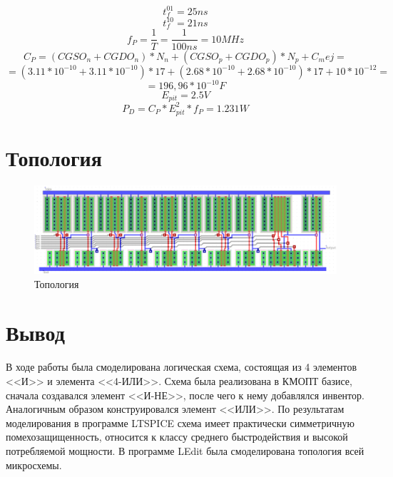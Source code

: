 \documentclass[a4paper,14pt]{article}
\begin{document}
$$t_{f}^{01} = 25ns$$
$$t_{f}^{10} = 21ns$$
$$f_{P} = \dfrac{1}{T} = \dfrac{1}{100ns} = 10 MHz$$
$$C_P = (CGSO_n + CGDO_n)*N_n + (CGSO_p + CGDO_p)*N_p + C_mej =$$ $$= (3.11 * 10^{-10} + 3.11 * 10^{-10}) * 17 + (2.68  * 10^{-10} + 2.68  * 10^{-10}) * 17  + 10 * 10^{-12}=$$
$$ =196,96*10 ^{-10}F$$
$$E_{pit} = 2.5V$$
$$P_D = C_P * E_{pit}^2 * f_P = 1.231W$$




\section{Топология}

\begin{landscape}
\begin{figure}[H]
	\centering		
	\includegraphics[width=\linewidth]{image/ledit_schema}
	\caption{Топология}\label{img:ledit_schema}
\end{figure}
\end{landscape}

\section{Вывод}

В ходе работы была смоделирована логическая схема, состоящая из 4 элементов <<И>> и элемента <<4-ИЛИ>>.
Схема была реализована в КМОПТ базисе, сначала создавался элемент <<И-НЕ>>, после чего к нему добавлялся инвентор.
Аналогичным образом конструировался элемент <<ИЛИ>>.
По результатам моделирования в программе LTSPICE схема имеет практически симметричную помехозащищенность, относится к классу среднего быстродействия и высокой потребляемой мощности.
В программе LEdit была смоделирована топология всей микросхемы.
\end{document}
